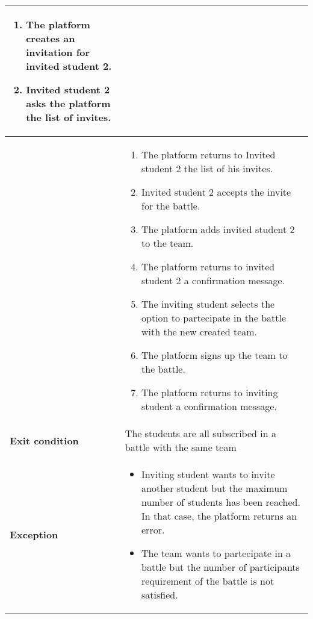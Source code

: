 \begin{enumerate}[label=\textbf{UC\arabic*}:,ref=UC\arabic*,leftmargin=1.3cm]
{\begin{longtable}{|l|p{11.9cm}|}
\begin{enumerate}[label=\arabic*.]
                        \item The platform creates an invitation for invited student 2.
                        \item Invited student 2 asks the platform the list of invites.
                              \setcounter{resumeEnumeration}{\value{enumii}}
                  \end{enumerate}          \\\hline
                                           &
                  \begin{enumerate}[label=\arabic*.]
                        \setcounter{enumii}{\value{resumeEnumeration}}
                        \item The platform returns to Invited student 2 the list of his invites.
                        \item Invited student 2 accepts the invite for the battle.
                        \item The platform adds invited student 2 to the team.
                        \item The platform returns to invited student 2 a confirmation message.
                        \item The inviting student selects the option to partecipate in the battle with the new created team.
                        \item The platform signs up the team to the battle.
                        \item The platform returns to inviting student a confirmation message.
                  \end{enumerate}                                                 \\\hline
                  \textbf{Exit condition}  & The students are all subscribed in a battle with the same team                                                            \\\hline
                  \textbf{Exception}       & \begin{itemize}
                                                   \item Inviting student wants to invite another student but the maximum number of students has been reached.
                                                         In that case, the platform returns an error.
                                                   \item The team wants to partecipate in a battle but the number of participants requirement of the battle is not satisfied.

\end{itemize}
\end{longtable}}
\end{enumerate}
